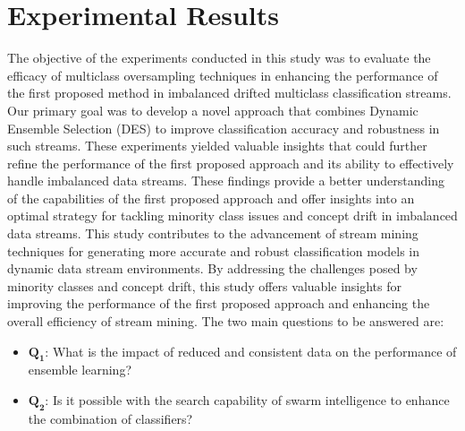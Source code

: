 %
%



\section{Experimental Results}
\label{sec:4_5_Expsetup}

The objective of the experiments conducted in this study was to evaluate the efficacy of multiclass oversampling techniques in enhancing the performance of the first proposed method in imbalanced drifted multiclass classification streams. Our primary goal was to develop a novel approach that combines Dynamic Ensemble Selection (DES) to improve classification accuracy and robustness in such streams. These experiments yielded valuable insights that could further refine the performance of the first proposed approach and its ability to effectively handle imbalanced data streams. These findings provide a better understanding of the capabilities of the first proposed approach and offer insights into an optimal strategy for tackling minority class issues and concept drift in imbalanced data streams. This study contributes to the advancement of stream mining techniques for generating more accurate and robust classification models in dynamic data stream environments. By addressing the challenges posed by minority classes and concept drift, this study offers valuable insights for improving the performance of the first proposed approach and enhancing the overall efficiency of stream mining. The two main questions to be answered are:

\begin{itemize}
  
      \item $\pmb{Q_1}$: What is the impact of reduced and consistent data on the performance of ensemble learning?
      \item  $\pmb{Q_2}$: Is it possible with the search capability of swarm intelligence to enhance the combination of classifiers? 
  \end{itemize}


